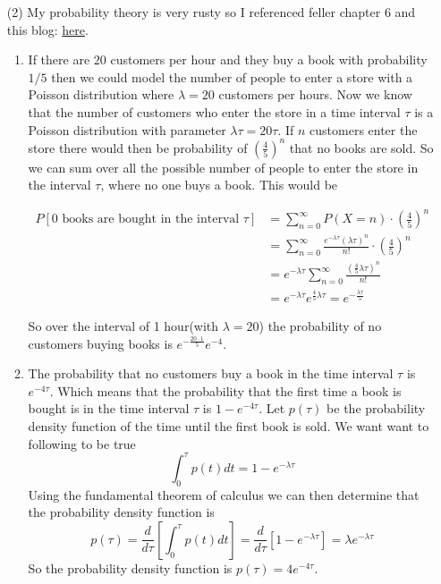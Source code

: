 \documentclass[12pt]{amsart}
\theoremstyle{definition}
\begin{document}
\begin{itemize}
\item[(2)] My probability theory is very rusty so I referenced feller chapter 6 and this blog: \href{https://www.probabilitycourse.com/chapter11/11_1_2_basic_concepts_of_the_poisson_process.php}{here}.

\begin{enumerate}[label=(\alph*)]
    \item If there are $20$ customers per hour and they buy a book with probability $1/5$ then we could model the number of people to enter a store with a Poisson distribution where $\lambda=20$ customers per hours. Now we know that the number of customers who enter the store in a time interval $\tau$ is a Poisson distribution with parameter $\lambda\tau=20\tau$. If $n$ customers enter the store there would then be probability of $(\frac{4}{5})^n$ that no books are sold. So we can sum over all the possible number of people to enter the store in the interval $\tau$, where no one buys a book. This would be
    
    \begin{align*}
        P\left[0 \text{ books are bought in the interval $\tau$}\right]&=
        \sum_{n=0}^\infty P(X=n)\cdot\left(\frac{4}{5}\right)^n\\
        &= \sum_{n=0}^\infty\frac{e^{-\lambda\tau}(\lambda\tau)^n}{n!}\cdot\left(\frac{4}{5}\right)^n\\
        &=e^{-\lambda\tau}\sum_{n=0}^\infty\frac{(\frac{4}{5}\lambda\tau)^n}{n!}\\
        &=e^{-\lambda\tau}e^{\frac{4}{5}\lambda\tau}=e^{-\frac{\lambda\tau}{5}}
    \end{align*}
    
    So over the interval of 1 hour(with $\lambda=20$) the probability of no customers buying books is $e^{-\frac{20\cdot 1}{5}}e^{-4}$.\\

    \item The probability that no customers buy a book in the time interval $\tau$ is $e^{-4\tau}$. Which means that the probability that the first time a book is bought is in the time interval $\tau$ is $1-e^{-4\tau}$. Let $p(\tau)$ be the probability density function of the time until the first book is sold. We want want to following to be true 
    $$\int_{0}^{\tau}p(t)dt=1-e^{-\lambda\tau}$$
    Using the fundamental theorem of calculus we can then determine that the probability density function is $$p(\tau)=\frac{d}{d\tau}\left[\int_{0}^{\tau}p(t)dt\right]=\frac{d}{d\tau}\left[1-e^{-\lambda\tau}\right]=\lambda e^{-\lambda\tau}$$ So the probability density function is $p(\tau)=4e^{-4\tau}$.\\


\end{enumerate}
\end{itemize}
\end{document}
